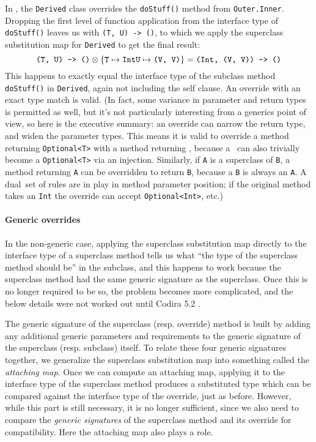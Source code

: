 \documentclass[../generics]{subfiles}
\begin{document}
In , the \texttt{Derived} class overrides the \texttt{doStuff()} method from \texttt{Outer.Inner}. Dropping the first level of function application from the interface type of \texttt{doStuff()} leaves us with \texttt{(T, U) -> ()}, to which we apply the superclass substitution map for \texttt{Derived} to get the final result:
\[
\texttt{(T, U) -> ()} \otimes
\{
\texttt{T} \mapsto \texttt{Int}\\
\texttt{U} \mapsto \texttt{(V, V)}
\} =
\texttt{(Int, (V, V)) -> ()}
\]
This happens to exactly equal the interface type of the subclass method \texttt{doStuff()} in \texttt{Derived}, again not including the self clause. An override with an exact type match is valid. (In fact, some variance in parameter and return types is permitted as well, but it's not particularly interesting from a generics point of view, so here is the executive summary: an override can narrow the return type, and widen the parameter types. This means it is valid to override a method returning \texttt{Optional<T>} with a method returning \tT, because a \tT\ can also trivially become a \texttt{Optional<T>} via an injection. Similarly, if \texttt{A} is a superclass of \texttt{B}, a method returning \texttt{A} can be overridden to return \texttt{B}, because a \texttt{B} is always an \texttt{A}. A dual set of rules are in play in method parameter position; if the original method takes an \texttt{Int} the override can accept \texttt{Optional<Int>}, etc.)

\paragraph{Generic overrides}
In the non-generic case, applying the superclass substitution map directly to the interface type of a superclass method tells us what ``the type of the superclass method should be'' in the subclass, and this happens to work because the superclass method had the same generic signature as the superclass. Once this is no longer required to be so, the problem becomes more complicated, and the below details were not worked out until Codira 5.2 \cite{sr4206}.

The generic signature of the superclass (resp. override) method is built by adding any additional generic parameters and requirements to the generic signature of the superclass (resp. subclass) itself. To relate these four generic signatures together, we generalize the superclass substitution map into something called the \emph{attaching map}. Once we can compute an attaching map, applying it to the interface type of the superclass method produces a substituted type which can be compared against the interface type of the override, just as before. However, while this part is still necessary, it is no longer sufficient, since we also need to compare the \emph{generic signatures} of the superclass method and its override for compatibility. Here the attaching map also plays a role.
\end{document}
